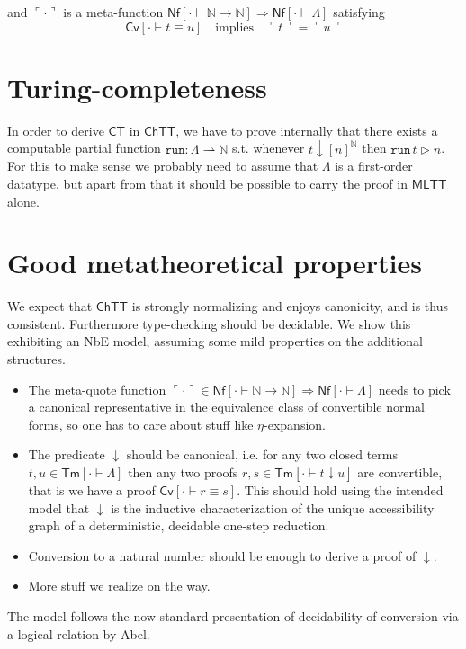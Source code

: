 \documentclass{article}
\newcommand{\MLTT}{\ensuremath{\mathsf{MLTT}}}
\newcommand{\CT}{\ensuremath{\mathsf{CT}}}
\newcommand{\CTTT}{\ensuremath{\mathsf{ChTT}}}
\newcommand{\Trm}[2]{\mathsf{Tm}[{{#1} \vdash {#2}}]}
\newcommand{\TNf}[2]{ {\mathsf{Nf}}[{{#1} \vdash {#2}}]}
\newcommand{\TEq}[3]{ {\mathsf{Cv}}[{{#1} \vdash {#2} \equiv {#3}}]}
\newcommand{\Code}{\Lambda}
\newcommand{\Red}{\mathrel{\downarrow}}
\newcommand{\Nat}{\mathbb{N}}
\newcommand{\QNf}[1]{{\ulcorner{#1}\urcorner}}
\newcommand{\Reif}[2]{{[#1]}^{#2}}
\begin{document}
\noindent and $\QNf{\cdot}$ is a meta-function $\TNf{\cdot}{\Nat\rightarrow\Nat} \Rightarrow \TNf{\cdot}{\Code}$ satisfying
\[ \TEq{\cdot}{t}{u} \quad \text{implies}\quad \QNf{t} = \QNf{u} \]

\section{Turing-completeness}

In order to derive $\CT$ in $\CTTT$, we have to prove internally that there exists a computable partial function $\mathtt{run} : \Code \rightharpoonup \Nat$ s.t. whenever $t \Red \Reif{n}{\Nat}$ then $\mathtt{run}\, t \rhd n$. For this to make sense we probably need to assume that $\Code$ is a first-order datatype, but apart from that it should be possible to carry the proof in $\MLTT$ alone. %

\section{Good metatheoretical properties}

We expect that $\CTTT$ is strongly normalizing and enjoys canonicity, and is thus consistent. Furthermore type-checking should be decidable. We show this exhibiting an NbE model, assuming some mild properties on the additional structures.

\begin{itemize}
 \item The meta-quote function $\QNf{\cdot} \in \TNf{\cdot}{\Nat\rightarrow\Nat} \Rightarrow \TNf{\cdot}{\Code}$ needs to pick a canonical representative in the equivalence class of convertible normal forms, so one has to care about stuff like $\eta$-expansion.
 \item The predicate $\Red$ should be canonical, i.e. for any two closed terms $t, u \in \Trm{\cdot}{\Code}$ then any two proofs $r, s \in \Trm{\cdot}{t \Red u}$ are convertible, that is we have a proof $\TEq{\cdot}{r}{s}$. This should hold using the intended model that $\Red$ is the inductive characterization of the unique accessibility graph of a deterministic, decidable one-step reduction.
 \item Conversion to a natural number should be enough to derive a proof of $\Red$.
 \item More stuff we realize on the way.
\end{itemize}

The model follows the now standard presentation of decidability of conversion via a logical relation by Abel.
\end{document}
